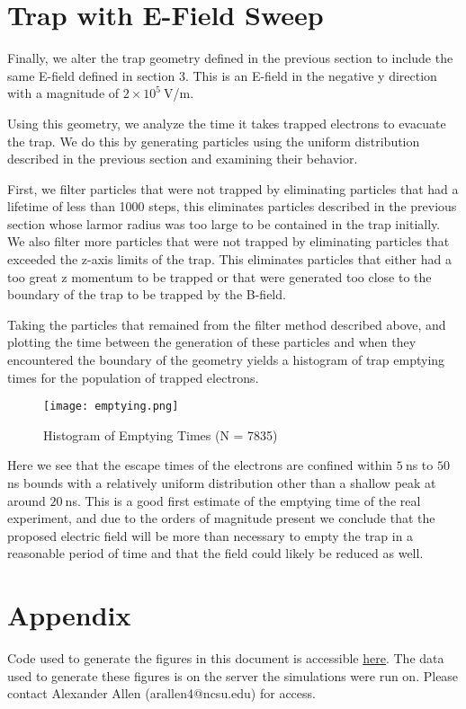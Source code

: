 \documentclass[12pt,letterpaper]{article}
\begin{document}
\section{Trap with E-Field Sweep}
Finally, we alter the trap geometry defined in the previous section to include the same E-field defined in section 3. This is an E-field in the negative y direction with a magnitude of $2\times10^5~$V/m. 

Using this geometry, we analyze the time it takes trapped electrons to evacuate the trap. We do this by generating particles using the uniform distribution described in the previous section and examining their behavior.

First, we filter particles that were not trapped by eliminating particles that had a lifetime of less than 1000 steps, this eliminates particles described in the previous section whose larmor radius was too large to be contained in the trap initially. We also filter more particles that were not trapped by eliminating particles that exceeded the z-axis limits of the trap. This eliminates particles that either had a too great z momentum to be trapped or that were generated too close to the boundary of the trap to be trapped by the B-field.

Taking the particles that remained from the filter method described above, and plotting the time between the generation of these particles and when they encountered the boundary of the geometry yields a histogram of trap emptying times for the population of trapped electrons. 

    \begin{figure}[H]
    \centering
    \texttt{[image: emptying.png]}
    \caption{Histogram of Emptying Times (N = 7835)}
    \end{figure}

Here we see that the escape times of the electrons are confined within $5~$ns to $50~$ns bounds with a relatively uniform distribution other than a shallow peak at around $20~$ns. This is a good first estimate of the emptying time of the real experiment, and due to the orders of magnitude present we conclude that the proposed electric field will be more than necessary to empty the trap in a reasonable period of time and that the field could likely be reduced as well. 

\section{Appendix}

Code used to generate the figures in this document is accessible \href{https://github.ncsu.edu/arallen4/CRES/blob/master/ConstantField.xml}{here}. The data used to generate these figures is on the server the simulations were run on. Please contact Alexander Allen (arallen4@ncsu.edu) for access. 
\end{document}
